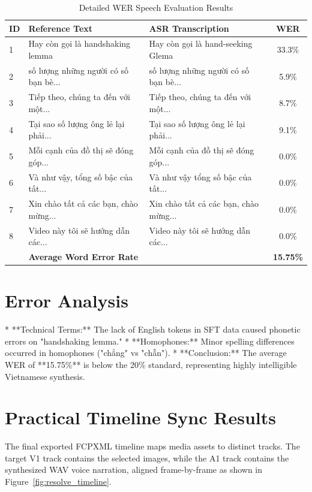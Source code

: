 \documentclass[a4paper,12pt]{report}
\begin{document}
\begin{table}[h!]
\centering
\small
\begin{tabular}{lllc}
\toprule
\textbf{ID} & \textbf{Reference Text} & \textbf{ASR Transcription} & \textbf{WER} \\
\midrule
1 & Hay còn gọi là handshaking lemma & Hay còn gọi là hand-seeking Glema & 33.3\% \\
2 & số lượng những người có số bạn bè... & số lượng những người có số bạn bè... & 5.9\% \\
3 & Tiếp theo, chúng ta đến với một... & Tiếp theo, chúng ta đến với một... & 8.7\% \\
4 & Tại sao số lượng ông lẻ lại phải... & Tại sao số lượng ông lẻ lại phải... & 9.1\% \\
5 & Mỗi cạnh của đồ thị sẽ đóng góp... & Mỗi cạnh của đồ thị sẽ đóng góp... & 0.0\% \\
6 & Và như vậy, tổng số bậc của tất... & Và như vậy tổng số bậc của tất... & 0.0\% \\
7 & Xin chào tất cả các bạn, chào mừng... & Xin chào tất cả các bạn, chào mừng... & 0.0\% \\
8 & Video này tôi sẽ hướng dẫn các... & Video này tôi sẽ hướng dẫn các... & 0.0\% \\
\midrule
& \textbf{Average Word Error Rate} & & \textbf{15.75\%} \\
\bottomrule
\end{tabular}
\caption{Detailed WER Speech Evaluation Results}
\label{tab:wer_eval}
\end{table}

\section{Error Analysis}
* **Technical Terms:** The lack of English tokens in SFT data caused phonetic errors on "handshaking lemma."
* **Homophones:** Minor spelling differences occurred in homophones ("chẳng" vs "chẵn").
* **Conclusion:** The average WER of **15.75\%** is below the 20\% standard, representing highly intelligible Vietnamese synthesis.

\section{Practical Timeline Sync Results}
The final exported FCPXML timeline maps media assets to distinct tracks. The target V1 track contains the selected images, while the A1 track contains the synthesized WAV voice narration, aligned frame-by-frame as shown in Figure~\ref{fig:resolve_timeline}.
\end{document}
